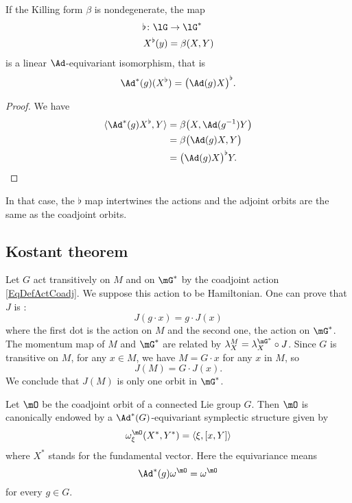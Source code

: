 \begin{lemma}
	If the Killing form $\beta$ is nondegenerate, the map
	\begin{equation}
		\begin{aligned}
			\flat\colon \lG&\to \lG^* \\
			X^{\flat}(y)&=\beta(X,Y)
		\end{aligned}
	\end{equation}
	is a linear $\Ad$-equivariant isomorphism, that is
	\begin{equation}
		\Ad^*(g)(X^{\flat})=\big( \Ad(g)X \big)^{\flat}.
	\end{equation}
\end{lemma}

\begin{proof}
	We have
	\begin{equation}
		\begin{aligned}[]
			\langle \Ad^*(g)X^{\flat}, Y\rangle &=\beta\big( X,\Ad(g^{-1})Y \big)\\
				&=\beta\big( \Ad(g)X,Y \big)\\
				&=\big( \Ad(g)X \big)^{\flat}Y.
		\end{aligned}
	\end{equation}
\end{proof}
In that case, the $\flat$ map intertwines the actions and the adjoint orbits are the same as the coadjoint orbits.


\subsection{Kostant theorem}

Let $G$ act transitively on $M$ and on $\mG^*$ by the coadjoint action \eqref{EqDefActCoadj}. We suppose this action to be Hamiltonian. One can prove that $J$ is :
\begin{equation}
  J(g\cdot x)=g\cdot J(x)
\end{equation}
where the first dot is the action on $M$ and the second one, the action on $\mG^*$. The momentum map of $M$ and $\mG^*$ are related by $\lambda_X^M=\lambda_X^{\mG^*}\circ J$. Since $G$ is transitive on $M$, for any $x\in M$, we have $M=G\cdot x$ for any $x$ in $M$, so
\[
  J(M)=G\cdot J(x).
\]
We conclude that $J(M)$ is only one orbit in $\mG^*$.

\begin{proposition}
	Let $\mO$ be the coadjoint orbit of a connected Lie group $G$. Then $\mO$ is canonically endowed by a $\Ad^*(G)$-equivariant symplectic structure given by
	\begin{equation}		\label{EqKKSsymple}
		\omega^{\mO}_{\xi}(X^*,Y^*)=\langle \xi, [x,Y]\rangle
	\end{equation}
	where $X^*$ stands for the fundamental vector. Here the equivariance means
	\begin{equation}
		\Ad^*(g)\omega^{\mO}=\omega^{\mO}
	\end{equation}
	for every $g\in G$.
\end{proposition}

